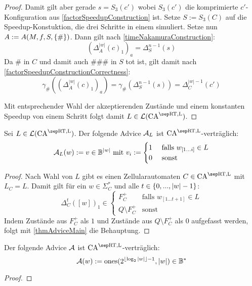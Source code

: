 \begin{proof}
    Damit gilt aber gerade $s = S_3(c')$ wobei $S_3(c')$ die komprimierte $c'$-Konfiguration aus \cref{factorSpeedupConstruction} ist.
    Setze $S := S_3(C)$ auf die Speedup-Konstuktion, die drei Schritte in einem simuliert. Setze nun $A := A(M, f, S, \{ {\#} \})$.
    Dann gilt nach \cref{timeNakamuraConstruction}:
    \[
        (\Delta^{ |w| }_A(c)_1)_a = \Delta_S^{n - 1}(s)
    \]
    Da $\#$ in $C$ und damit auch $\#\#\#$ in $S$ tot ist, gilt damit nach \cref{factorSpeedupConstructionCorrectness}:
    \[
        \gamma_\#((\Delta^{ |w| }_A(c)_1)_a) = \gamma_\#(\Delta_S^{n-1}(s)) = \Delta_C^{|w| - 1}(c')
    \]
    
    Mit entsprechender Wahl der akzeptierenden Zustände und einem konstanten Speedup von einem Schritt
    folgt damit $L \in \CAL{\CART, \CALeft}$.
\end{proof}

\begin{corollary}
    Sei $L \in \CAL{\CART, \CALeft}$.
    Der folgende Advice $\mathcal{A}_L$ ist $\CAM{\CART, \CALeft}$-verträglich:
    \[
        \mathcal{A}_L(w) := v \in \mathbb{B}^{|w|} \text{ mit } v_i :=
        \begin{cases}
            1 & \text{ falls } w_{[1...i]} \in L \\
            0 & \text{ sonst }
        \end{cases}
    \]
\end{corollary}
\begin{proof}
    Nach Wahl von $L$ gibt es einen Zellularautomaten $C \in \CAM{\CART, \CALeft}$
    mit $L_C = L$. Damit gilt für ein $w \in \Sigma_C^*$ und alle $t \in \{ {0, ..., |w|-1} \}$:
    \[
        \Delta_C^{t}([w])_1 \in
        \begin{cases}
            F_C^+ & \text{falls } w_{[1...t+1]} \in L \\
            Q \setminus F_C^+ & \text {sonst}
        \end{cases}
    \]
    Indem Zustände aus $F_C^+$ als $1$ und Zustände aus $Q \setminus F_C^+$ als $0$ aufgefasst werden, 
    folgt mit \cref{thmAdviceMain} die Behauptung.
\end{proof}


\begin{satz}
    Der folgende Advice $\mathcal{A}$ ist $\CAM{\CART, \CALeft}$-verträglich:
    \[
        \mathcal{A}(w) := \mathrm{ones}(2^{\lfloor \log_2{|w|} \rfloor - 1}, |w|) \in \mathbb{B}^*
    \]
\end{satz}
\begin{proof}
    
\end{proof}
